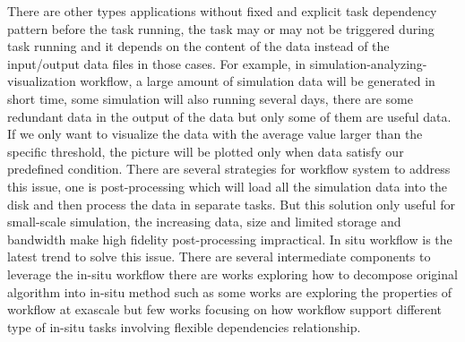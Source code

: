 There are other types applications without fixed and explicit task dependency pattern before the task running, the task may or may not be triggered during task running and it depends on the content of the data instead of the input/output data files in those cases. For example, in simulation-analyzing-visualization workflow, a large amount of simulation data will be generated in short time, some simulation will also running several days, there are some redundant data in the output of the data but only some of them are useful data. If we only want to visualize the data with the average value larger than the specific threshold, the picture will be plotted only when data satisfy our predefined condition. There are several strategies for workflow system to address this issue, one is post-processing which will load all the simulation data into the disk and then process the data in separate tasks. But this solution only useful for small-scale simulation, the increasing data, size and limited storage and bandwidth make high fidelity post-processing impractical\cite{ayachit2015paraview}. In situ workflow is the latest trend to solve this issue\cite{dreher2017situ}. There are several intermediate components to leverage the in-situ workflow\cite{docan2012dataspaces,ayachit2015paraview}  there are works exploring how to decompose original algorithm into in-situ method such as\cite{bennett2012combining} some works are exploring the properties of workflow at exascale\cite{dreher2017situ} but few works focusing on how workflow support different type of in-situ tasks involving flexible dependencies relationship. 

